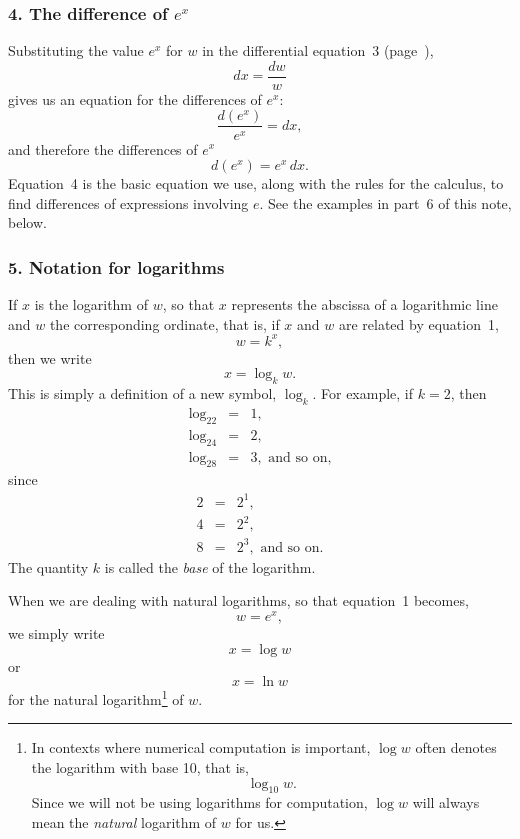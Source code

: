 \documentclass[polutonikogreek,english,twoside,openright]{article}
\begin{document}
\subsubsection*{4. The difference  of $e^x$}

Substituting the value $e^x$ for $w$ in the differential equation~3 (page~\pageref{logdeq}),
\setcounter{equation}{2}
\begin{equation}
dx = \frac{dw}{w}
\end{equation}
 gives us an equation for the differences of $e^x$:
$$\frac{d(e^x)}{e^x}   =  dx,$$
and therefore the differences of $e^x$
\begin{equation}
d(e^x) =  e^x\,dx.\label{dex}
\end{equation}
Equation~4 is the basic equation we use, along with the rules for the
calculus, to find differences of expressions involving $e$.  See the
examples in part~6 of this note, below.



\subsubsection*{5. Notation for logarithms}

If $x$ is the logarithm of $w$, so that $x$ represents the abscissa of
a logarithmic line and $w$ the corresponding ordinate, that is, if $x$
and $w$ are related by equation~1,
$$w = k^x,$$
then we write 
$$x = \log_kw.$$
This is simply a definition of a new symbol, $\log_k$.  For example, if $k=2$, then
\begin{eqnarray*}
\log_22 & = & 1,\\
\log_24 & = & 2,\\
\log_28 & = & 3, \mbox{ and so on,}
\end{eqnarray*}
since 
\begin{eqnarray*}
2 & = & 2^1 ,\\
4 & = & 2^2,\\
8 & = & 2^3, \mbox{ and so on.}
\end{eqnarray*}
The quantity $k$ is called the {\em base} of the logarithm.

When we are dealing with natural logarithms, so that equation~1 becomes,
$$w = e^x,$$
we simply write
$$x = \log w$$\label{nlognotation}
or
$$x = \ln w$$
for the natural logarithm\footnote{In contexts where numerical
  computation is important, $\log w$ often denotes the logarithm with
  base 10, that is,
$$\log_{10} w.$$
Since we will not be using logarithms for computation, $\log w$ will
always mean the {\em natural} logarithm of $w$ for us.} of $w$.
\end{document}
